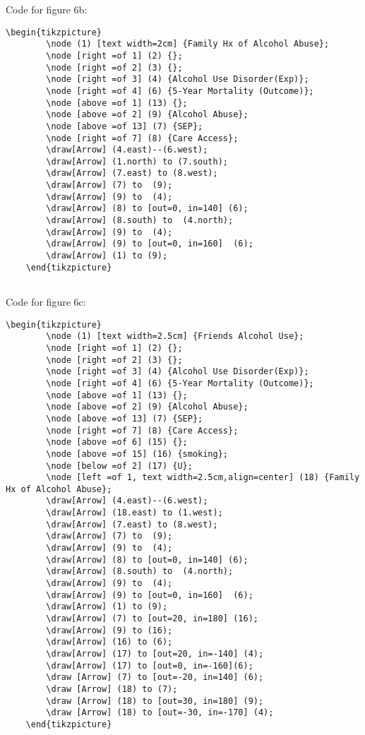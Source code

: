 \documentclass{article}
\begin{document}
Code for figure 6b:
\begin{lstlisting}[frame=single, basicstyle=\ttfamily]
    \begin{tikzpicture}
        \node (1) [text width=2cm] {Family Hx of Alcohol Abuse};
        \node [right =of 1] (2) {};
        \node [right =of 2] (3) {};
        \node [right =of 3] (4) {Alcohol Use Disorder(Exp)};
        \node [right =of 4] (6) {5-Year Mortality (Outcome)};
        \node [above =of 1] (13) {};
        \node [above =of 2] (9) {Alcohol Abuse};
        \node [above =of 13] (7) {SEP};
        \node [right =of 7] (8) {Care Access};
        \draw[Arrow] (4.east)--(6.west);
        \draw[Arrow] (1.north) to (7.south);
        \draw[Arrow] (7.east) to (8.west);
        \draw[Arrow] (7) to  (9);
        \draw[Arrow] (9) to  (4);
        \draw[Arrow] (8) to [out=0, in=140] (6);
        \draw[Arrow] (8.south) to  (4.north);
        \draw[Arrow] (9) to  (4);
        \draw[Arrow] (9) to [out=0, in=160]  (6);
        \draw[Arrow] (1) to (9);
    \end{tikzpicture}
    

\end{lstlisting}

Code for figure 6c:
\begin{lstlisting}[frame=single, basicstyle=\ttfamily]
    \begin{tikzpicture}
        \node (1) [text width=2.5cm] {Friends Alcohol Use};
        \node [right =of 1] (2) {};
        \node [right =of 2] (3) {};
        \node [right =of 3] (4) {Alcohol Use Disorder(Exp)};
        \node [right =of 4] (6) {5-Year Mortality (Outcome)};
        \node [above =of 1] (13) {};
        \node [above =of 2] (9) {Alcohol Abuse};
        \node [above =of 13] (7) {SEP};
        \node [right =of 7] (8) {Care Access};
        \node [above =of 6] (15) {};
        \node [above =of 15] (16) {smoking};
        \node [below =of 2] (17) {U};
        \node [left =of 1, text width=2.5cm,align=center] (18) {Family Hx of Alcohol Abuse};
        \draw[Arrow] (4.east)--(6.west);
        \draw[Arrow] (18.east) to (1.west);
        \draw[Arrow] (7.east) to (8.west);
        \draw[Arrow] (7) to  (9);
        \draw[Arrow] (9) to  (4);
        \draw[Arrow] (8) to [out=0, in=140] (6);
        \draw[Arrow] (8.south) to  (4.north);
        \draw[Arrow] (9) to  (4);
        \draw[Arrow] (9) to [out=0, in=160]  (6);
        \draw[Arrow] (1) to (9);
        \draw[Arrow] (7) to [out=20, in=180] (16);
        \draw[Arrow] (9) to (16);
        \draw[Arrow] (16) to (6);
        \draw[Arrow] (17) to [out=20, in=-140] (4);
        \draw[Arrow] (17) to [out=0, in=-160](6);
        \draw [Arrow] (7) to [out=-20, in=140] (6);
        \draw [Arrow] (18) to (7);
        \draw [Arrow] (18) to [out=30, in=180] (9);
        \draw [Arrow] (18) to [out=-30, in=-170] (4);
    \end{tikzpicture}
\end{lstlisting}
\end{document}
